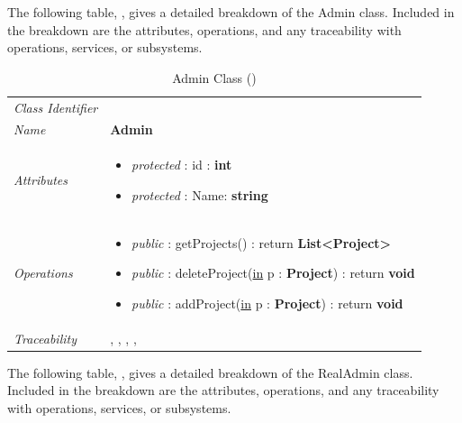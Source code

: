 \documentclass[12pt,letterpaper]{article}
\begin{document}
The following table, , gives a detailed breakdown of the Admin class. Included in the breakdown are the attributes, operations, and any traceability with operations, services, or subsystems.

\begin{table}[H]
    \caption{Admin Class ()} 
	\begin{tabu} to 
		\toprule
		Class Identifier &  \\
		Name & {\bf Admin} \\
		Attributes & 
		\begin{minipage}[t]{\linewidth}
		    \begin{itemize}
		        \item \textit{protected} : id : {\bf int}
		        \item \textit{protected} : Name: {\bf string}
			\end{itemize}
	    \end{minipage} \\

		Operations &
		\begin{minipage}[t]{\linewidth}
			\begin{itemize}
			    \item {\it public} : getProjects() : return {\bf List<Project>}
			    \item {\it public} : deleteProject(\underline{in} p : {\bf Project}) : return {\bf void}
			    \item {\it public} : addProject(\underline{in} p : {\bf Project}) : return {\bf void}
	        \end{itemize}
	    \end{minipage} \\
	    	Traceability & , , , , \\
		\toprule
	\end{tabu}
\end{table}

The following table, , gives a detailed breakdown of the RealAdmin class. Included in the breakdown are the attributes, operations, and any traceability with operations, services, or subsystems.
\end{document}

